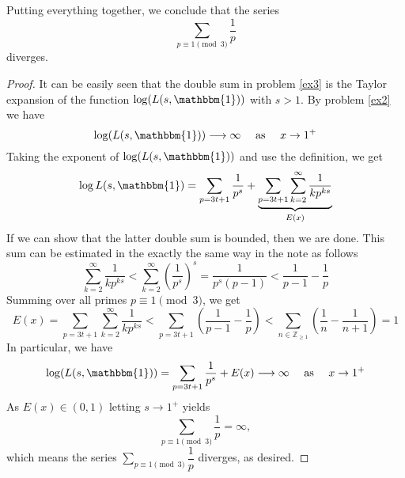 \documentclass[11pt,letterpaper]{article}
\newcounter{problem}
\DeclareMathOperator{\1}{\mathbbm{1}}
\begin{document}
\begin{exercise}
  Putting everything together, we conclude that the series $$\displaystyle\sum_{p \equiv 1 \pmod 3} \dfrac{1}{p}$$ diverges.
\end{exercise}
\begin{proof}
  It can be easily seen that the double sum in problem \ref{ex3} is the Taylor expansion of the function $\log(L(s,\mathbbm{1}))$ with $s>1$. By problem \ref{ex2} we have
  \[ \log(L(s,\mathbbm{1})) \longrightarrow \infty \quad \text{ as } \quad x \to 1^+\]
  Taking the exponent of $\log(L(s,\mathbbm{1}))$ and use the definition, we get
  \[ \log L(s,\mathbbm{1}) = \sum_{p=3t+1} \dfrac{1}{p^s} + \underbrace{\sum_{p=3t+1}\sum_{k=2}^\infty  \dfrac{1}{kp^{ks}}}_{E(x)}\]
  If we can show that the latter double sum is bounded, then we are done. This sum can be estimated in the exactly the same way
  in the note as follows
  \[\sum_{k=2}^\infty  \dfrac{1}{kp^{ks}} < \sum_{k=2}^\infty \left(\dfrac{1}{p^s}\right)^s= \dfrac{1}{p^s(p-1)} < \dfrac{1}{p-1}-\dfrac{1}{p} \]
  Summing over all primes $p \equiv 1 \pmod 3$, we get
  \[E(x) = \sum_{p=3t+1}\sum_{k=2}^\infty  \dfrac{1}{kp^{ks}} < \sum_{p=3t+1} \left(\dfrac{1}{p-1}-\dfrac{1}{p}\right) < \sum_{n \in \mathbb{Z}_{\ge 1}}\left(\dfrac{1}{n}-\dfrac{1}{n+1}\right)=1\]
  In particular, we have
  \[ \log(L(s,\mathbbm{1})) = \sum_{p=3t+1} \dfrac{1}{p^s} + E(x) \longrightarrow \infty \quad \text{ as } \quad x \to 1^+\]
  As $E(x) \in (0,1)$ letting $s \to 1^+$ yields
  \[\sum_{p \equiv 1 \pmod 3} \dfrac{1}{p} =\infty,\]
  which means the series $\displaystyle\sum_{p \equiv 1 \pmod 3} \dfrac{1}{p}$ diverges, as desired.
\end{proof}
\end{document}
